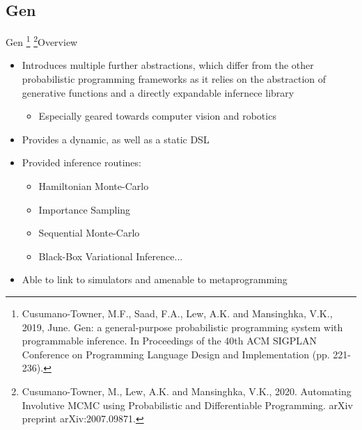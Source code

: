 \documentclass[AERbeamer%
              ,optEnglish%
              ,optBiber%
              ,optBibstyleAlphabetic%
              ,optBeamerClassicFormat%
              ]{AERlatex}%
\begin{document}
\subsection{Gen}
\begin{frame}[c]{Gen \footnote{Cusumano-Towner, M.F., Saad, F.A., Lew, A.K. and Mansinghka, V.K., 2019, June. Gen: a general-purpose
                               probabilistic programming system with programmable inference. In Proceedings of the 40th ACM SIGPLAN
                               Conference on Programming Language Design and Implementation (pp. 221-236).}
                     \footnote{Cusumano-Towner, M., Lew, A.K. and Mansinghka, V.K., 2020. Automating Involutive MCMC using
                               Probabilistic and Differentiable Programming. arXiv preprint arXiv:2007.09871.}}{Overview}
    \centering
    \begin{itemize} %
        \item Introduces multiple further abstractions, which differ from the other probabilistic programming frameworks
              as it relies on the abstraction of generative functions and a directly expandable infernece library
        \begin{itemize}
            \item Especially geared towards computer vision and robotics
        \end{itemize}
        \item Provides a dynamic, as well as a static DSL
        \item Provided inference routines:
        \begin{itemize}
            \item Hamiltonian Monte-Carlo
            \item Importance Sampling
            \item Sequential Monte-Carlo
            \item Black-Box Variational Inference...
        \end{itemize}
        \item Able to link to simulators and amenable to metaprogramming
    \end{itemize}
\end{frame}
\end{document}
